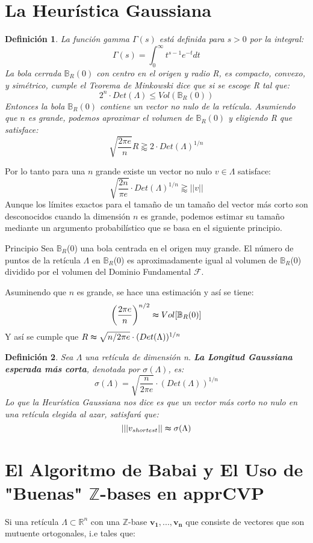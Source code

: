 \documentclass[12pt]{report}
\newtheorem{defi}{Definición}
\begin{document}
\section{La Heurística Gaussiana}
\begin{defi} 
La función gamma $\Gamma(s)$ está definida para $s>0$ por la integral:
 \[ \Gamma(s) = \int_{0}^{\infty} t^{s-1}e^{-t} dt \]
 La bola cerrada $\mathbb{B}_{R}(0)$ con centro en el origen y radio R, es compacto, convexo, y simétrico, cumple el Teorema de Minkowski dice que si se escoge R tal que:
 \[ 2^{n}\cdot Det(\Lambda) \leq Vol(\mathbb{B}_{R}(0)) \]
 Entonces la bola $\mathbb{B}_{R}(0)$ contiene un vector no nulo de la retícula. Asumiendo que $n$ es grande, podemos aproximar el volumen de $\mathbb{B}_{R}(0)$ y eligiendo R que satisface:
  \[\sqrt{\frac{2 \pi e}{n}} R \gtrapprox 2 \cdot Det(\Lambda)^{1/n}\]
\end{defi}


 Por lo tanto para una $n$ grande existe un vector no nulo $v \in \Lambda$ satisface:
 \[\sqrt{\frac{2 n}{\pi e}}\cdot Det(\Lambda)^{1/n} \gtrapprox ||v||\]
Aunque los límites exactos para el tamaño de un tamaño del vector más corto son desconocidos cuando la dimensión $n$ es grande, podemos estimar su tamaño mediante un argumento probabilístico que se basa en el siguiente principio.
\begin{block}{Principio}
        Sea $\mathbb{B}_{R}$(0) una bola centrada en el origen muy grande. El número de puntos de la retícula $\Lambda$ en $\mathbb{B}_{R}$(0) es aproximadamente igual al volumen de $\mathbb{B}_{R}$(0) dividido por el volumen del Dominio Fundamental $\mathcal{F}$.
    \end{block}

Asuminendo que $n$ es grande, se hace una estimación y así se tiene: 
 \[ \left( \frac{2 \pi e}{n} \right)^{n/2} \thickapprox Vol[\mathbb{B}_{R}(0)]\]
Y así se cumple que $R \thickapprox \sqrt{n/2 \pi e}\cdot (Det(\Lambda))^{1/n}$ \\
\begin{defi} 
Sea $\Lambda$ una retícula de dimensión n. \textbf{La Longitud Gaussiana esperada más corta}, denotada por $\sigma(\Lambda)$, es: 
 \[ \sigma(\Lambda) = \sqrt{\frac{n}{2 \pi e}}\cdot(Det(\Lambda))^{1/n}\]
Lo que la Heurística Gaussiana nos dice es que un vector más corto no nulo en una retícula elegida al azar, satisfará que: 
\[ |||v_{shortest} || \thickapprox \sigma(\Lambda)\]
\end{defi}

\section{El Algoritmo de Babai y El Uso de "Buenas" $\mathbb{Z}$-bases en \textbf{apprCVP}}
Si una retícula $\Lambda \subset \mathbb{R}^{n}$ con una $\mathbb{Z}$-base $\mathbf{v_{1}},..., \mathbf{v_{n}}$ que consiste de vectores que son mutuente ortogonales, i.e tales que:
\end{document}
